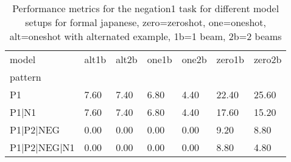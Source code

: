 \begin{table}[h]
\begin{tabular}{l|llllll}
\toprule
model & alt1b & alt2b & one1b & one2b & zero1b & zero2b \\
pattern &  &  &  &  &  &  \\
\midrule
P1 & 7.60 & 7.40 & 6.80 & 4.40 & 22.40 & 25.60 \\
P1|N1 & 7.60 & 7.40 & 6.80 & 4.40 & 17.60 & 15.20 \\
P1|P2|NEG & 0.00 & 0.00 & 0.00 & 0.00 & 9.20 & 8.80 \\
P1|P2|NEG|N1 & 0.00 & 0.00 & 0.00 & 0.00 & 8.80 & 4.80 \\
\bottomrule
\end{tabular}
\caption{Performance metrics for the negation1 task for different model setups for formal japanese, zero=zeroshot, one=oneshot, alt=oneshot with alternated example, 1b=1 beam, 2b=2 beams}
\label{tab:ja form_negation1_performance}
\end{table}
